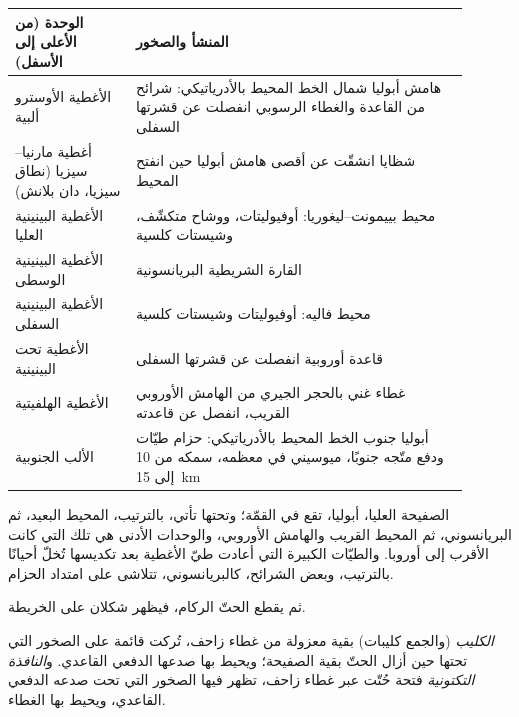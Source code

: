 \begin{omfigure}
\centering\small
\begin{tabular}{>{\raggedright\arraybackslash}p{0.24\linewidth}|>{\raggedright\arraybackslash}p{0.66\linewidth}}
الوحدة (من الأعلى إلى الأسفل) & المنشأ والصخور \\ \hline
الأغطية الأوسترو ألبية & هامش أبوليا شمال الخط المحيط بالأدرياتيكي: شرائح من القاعدة والغطاء
الرسوبي انفصلت عن قشرتها السفلى \\
أغطية مارنيا--سيزيا (نطاق سيزيا، دان بلانش) & شظايا انشقّت عن أقصى
هامش أبوليا حين انفتح المحيط \\
الأغطية البينينية العليا & محيط بييمونت--ليغوريا: أوفيوليتات، ووشاح متكشّف، وشيستات
كلسية \\
الأغطية البينينية الوسطى & القارة الشريطية البريانسونية \\
الأغطية البينينية السفلى & محيط فاليه: أوفيوليتات وشيستات كلسية \\
الأغطية تحت البينينية & قاعدة أوروبية انفصلت عن قشرتها السفلى \\
الأغطية الهلفيتية & غطاء غني بالحجر الجيري من الهامش الأوروبي القريب، انفصل عن
قاعدته \\ \hline
الألب الجنوبية & أبوليا جنوب الخط المحيط بالأدرياتيكي: حزام طيّات ودفع متّجه جنوبًا،
ميوسيني في معظمه، سمكه من 10 إلى \qty{15}{km}
\end{tabular}
\par{}
\end{omfigure}

الصفيحة العليا، أبوليا، تقع في القمّة؛ وتحتها تأتي، بالترتيب، المحيط البعيد، ثم
البريانسوني، ثم المحيط القريب والهامش الأوروبي، والوحدات الأدنى هي تلك التي
كانت الأقرب إلى أوروبا. والطيّات الكبيرة التي أعادت طيّ الأغطية بعد تكديسها
تُخلّ أحيانًا بالترتيب، وبعض الشرائح، كالبريانسوني، تتلاشى على امتداد
الحزام.

ثم يقطع الحتّ الركام، فيظهر شكلان على الخريطة.

\begin{definition}\label{def:b2:alpine-orogen:klippe}
\emph{الكليب} (والجمع كليبات) بقية معزولة من غطاء زاحف، تُركت
قائمة على الصخور التي تحتها حين أزال الحتّ بقية الصفيحة؛ ويحيط بها
صدعها الدفعي القاعدي. و\emph{النافذة التكتونية} فتحة
حُتّت عبر غطاء زاحف، تظهر فيها الصخور التي تحت صدعه الدفعي القاعدي، ويحيط بها
الغطاء.
\end{definition}


